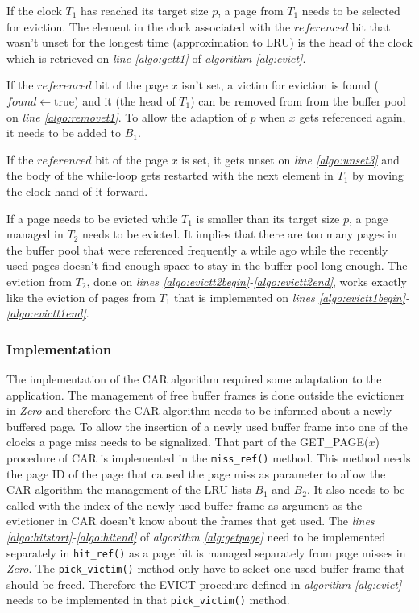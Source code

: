 	If the clock $T_1$ has reached its target size $p$, a page from $T_1$ needs to be selected for eviction. The element in the clock associated with the $referenced$ bit that wasn't unset for the longest time (approximation to LRU) is the head of the clock which is retrieved on \emph{line \ref{algo:gett1}} of \emph{algorithm \ref{alg:evict}}.
	
	If the $referenced$ bit of the page $x$ isn't set, a victim for eviction is found ($found \leftarrow \text{true}$) and it (the head of $T_1$) can be removed from from the buffer pool on \emph{line \ref{algo:removet1}}. To allow the adaption of $p$ when $x$ gets referenced again, it needs to be added to $B_1$.
	
	If the $referenced$ bit of the page $x$ is set, it gets unset on \emph{line \ref{algo:unset3}} and the body of the while-loop gets restarted with the next element in $T_1$ by moving the clock hand of it forward.
	
	If a page needs to be evicted while $T_1$ is smaller than its target size $p$, a page managed in $T_2$ needs to be evicted. It implies that there are too many pages in the buffer pool that were referenced frequently a while ago while the recently used pages doesn't find enough space to stay in the buffer pool long enough. The eviction from $T_2$, done on \emph{lines \ref{algo:evictt2begin}-\ref{algo:evictt2end}}, works exactly like the eviction of pages from $T_1$ that is implemented on \emph{lines \ref{algo:evictt1begin}-\ref{algo:evictt1end}}.

\subsubsection{Implementation}

	The implementation of the CAR algorithm required some adaptation to the application. The management of free buffer frames is done outside the evictioner in \emph{Zero} and therefore the CAR algorithm needs to be informed about a newly buffered page. To allow the insertion of a newly used buffer frame into one of the clocks a page miss needs to be signalized. That part of the GET\_PAGE($x$) procedure of CAR is implemented in the \lstinline{miss_ref()} method. This method needs the page ID of the page that caused the page miss as parameter to allow the CAR algorithm the management of the LRU lists $B_1$ and $B_2$. It also needs to be called with the index of the newly used buffer frame as argument as the evictioner in CAR doesn't know about the frames that get used. The \emph{lines \ref{algo:hitstart}-\ref{algo:hitend}} of \emph{algorithm \ref{alg:getpage}} need to be implemented separately in \lstinline{hit_ref()} as a page hit is managed separately from page misses in \emph{Zero}. The \lstinline{pick_victim()} method only have to select one used buffer frame that should be freed. Therefore the EVICT procedure defined in \emph{algorithm \ref{alg:evict}} needs to be implemented in that \lstinline{pick_victim()} method.

